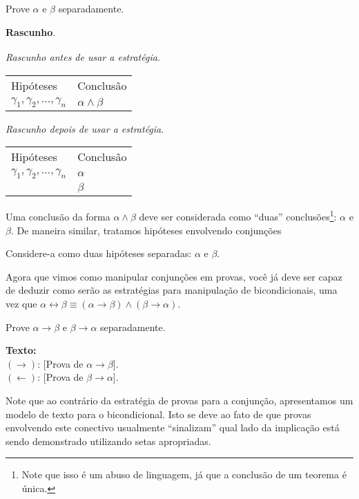 \begin{ProofStrategy} Prove $\alpha$ e $\beta$ separadamente.
\begin{flushleft}
 \textbf{Rascunho}.\\
\verb| |\\

\textit{Rascunho antes de usar a estratégia}.
\verb| |\\
\begin{tabular}{ll}
Hipóteses & Conclusão \\
$\gamma_1,\gamma_2,...,\gamma_n$ & $\alpha\land\beta$\\
\end{tabular}

\textit{Rascunho depois de usar a estratégia}.
\verb| |\\
\begin{tabular}{ll}
Hipóteses & Conclusão \\
$\gamma_1,\gamma_2,...,\gamma_n$ & $\alpha$\\
                                                            & $\beta$\\
\end{tabular}
\end{flushleft}
\end{ProofStrategy}
Uma conclusão da forma $\alpha\land \beta$ deve ser considerada como
``duas'' conclusões\footnote{Note que isso é um abuso de linguagem, já
  que a conclusão de um teorema é única.}:
$\alpha$ e $\beta$. De maneira similar, tratamos hipóteses envolvendo
conjunções
\begin{HypothesisStrategy}
Considere-a como duas hipóteses separadas: $\alpha$ e $\beta$.
\end{HypothesisStrategy}
Agora que vimos como manipular conjunções em provas, você já deve ser
capaz de deduzir como serão as estratégias para manipulação de
bicondicionais, uma vez que $\alpha\leftrightarrow\beta\equiv(\alpha\to\beta)\land(\beta\to\alpha)$.
\begin{ProofStrategy}
Prove $\alpha\to\beta$ e $\beta\to\alpha$ separadamente.
\begin{flushleft}
\textbf{Texto:}\\
$(\to)$: [Prova de $\alpha\to\beta$].\\
$(\leftarrow)$: [Prova de $\beta\to\alpha$].
\end{flushleft}
\end{ProofStrategy}
Note que ao contrário da estratégia de provas para a conjunção,
apresentamos um modelo de texto para o bicondicional. Isto se deve ao
fato de que provas envolvendo este conectivo usualmente ``sinalizam''
qual lado da implicação está sendo demonstrado utilizando setas
apropriadas.

